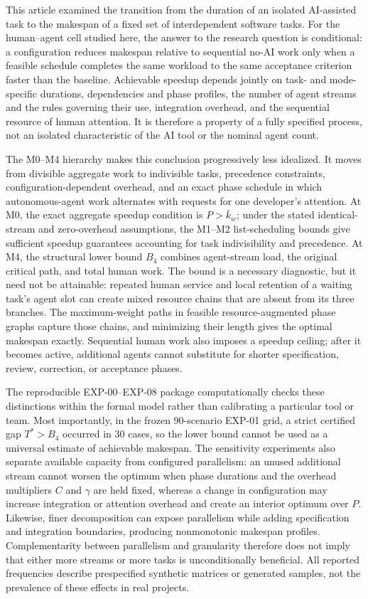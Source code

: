 This article examined the transition from the duration of an isolated
AI-assisted task to the makespan of a fixed set of interdependent software
tasks. For the human--agent cell studied here, the answer to the research
question is conditional: a configuration reduces makespan relative to
sequential no-AI work only when a feasible schedule completes the same workload
to the same acceptance criterion faster than the baseline. Achievable speedup
depends jointly on task- and mode-specific durations, dependencies and phase
profiles, the number of agent streams and the rules governing their use,
integration overhead, and the sequential resource of human attention. It is
therefore a property of a fully specified process, not an isolated
characteristic of the AI tool or the nominal agent count.

The M0--M4 hierarchy makes this conclusion progressively less idealized. It
moves from divisible aggregate work to indivisible tasks, precedence
constraints, configuration-dependent overhead, and an exact phase schedule in
which autonomous-agent work alternates with requests for one developer's
attention. At M0, the exact aggregate speedup condition is
$P>\bar{k}_w$; under the stated identical-stream and zero-overhead assumptions,
the M1--M2 list-scheduling bounds give sufficient speedup guarantees accounting
for task indivisibility and precedence. At M4, the structural lower bound $B_4$
combines agent-stream load, the original critical path, and total human work.
The bound is a necessary diagnostic, but it need not be attainable: repeated
human service and local retention of a waiting task's agent slot can create
mixed resource chains that are absent from its three branches. The
maximum-weight paths in feasible resource-augmented phase graphs capture those
chains, and minimizing their length gives the optimal makespan exactly.
Sequential human work also imposes a speedup ceiling; after it becomes active,
additional agents cannot substitute for shorter specification, review,
correction, or acceptance phases.

The reproducible EXP-00--EXP-08 package computationally checks these
distinctions within the formal model rather than calibrating a particular tool
or team. Most importantly, in the frozen 90-scenario EXP-01 grid, a strict
certified gap $T^*>B_4$ occurred in 30 cases, so the lower bound cannot be used
as a universal estimate of achievable makespan. The sensitivity experiments
also separate available capacity from configured parallelism: an unused
additional stream cannot worsen the optimum when phase durations and the
overhead multipliers $C$ and $\gamma$ are held fixed, whereas a change in
configuration may increase integration or attention overhead and create an
interior optimum over $P$. Likewise, finer decomposition can expose parallelism
while adding specification and integration boundaries, producing nonmonotonic
makespan profiles. Complementarity between parallelism and granularity therefore
does not imply that either more streams or more tasks is unconditionally
beneficial. All reported frequencies describe prespecified synthetic matrices
or generated samples, not the prevalence of these effects in real projects.

